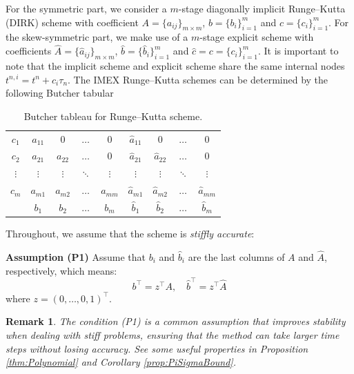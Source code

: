 \documentclass[a4paper, oneside]{book}
\def\hata{{\hat{a}}}
\def\hatA{{\hat{A}}}
\def\hatb{{\hat{b}}}
\newtheorem{remark}{Remark}[section]
\begin{document}


For the symmetric part, we consider a $m$-stage diagonally implicit Runge--Kutta (DIRK) scheme
with coefficient $A = \{a_{ij}\}_{m\times m}$, $b = \{b_{i}\}_{i=1}^m$ and $c = \{c_{i}\}_{i=1}^m$.
For the skew-symmetric part, we make use of a $m$-stage explicit scheme
with coefficients $\hatA = \{\hata_{ij}\}_{m\times m}$, $\hatb = \{\hatb_{i}\}_{i=1}^m$ and $\hat{c}=c = \{c_i\}_{i=1}^m$.
It is important to note that the implicit scheme and explicit scheme share the same internal nodes $t^{n,i} = t^{n}+c_i\tau_n$.
The IMEX Runge--Kutta schemes can be determined by the following Butcher tabular
\begin{table} 
    \centering
    \begin{tabular}[h]{c|cccc|cccc}
        $c_1$ & $a_{11}$ & $0$ & $\dots$ & $0$ & $\hata_{11}$ & $0$ & $\dots$ & $0$ \\
        $c_2$ & $a_{21}$ & $a_{22}$  & $\dots$ & $0$ & $\hata_{21}$ & $\hata_{22}$ & $\dots$ & $0$ \\
        $\vdots$ & $\vdots$ & $\vdots$  & $\ddots$ & $\vdots$ & $\vdots$ & $\vdots$ & $\ddots$ & $\vdots$ \\
        $c_m$ & $a_{m1}$ & $a_{m2}$  & $\dots$ & $a_{mm}$ & $\hata_{m1}$ & $\hata_{m2}$ & $\dots$ & $\hata_{mm}$ \\
        \hline
           & $b_1$ & $b_2$ & $\dots$ & $b_m$ & $\hatb_1$ & $\hatb_2$ & $\dots$ & $\hatb_m$
    \end{tabular}
    \caption{Butcher tableau for Runge--Kutta scheme.}
    \label{tab:Butcher}
\end{table}


Throughout, we assume that the scheme is \emph{stiffly accurate}:\vskip5pt

\noindent \textbf{Assumption (P1)} Assume that $b_i$ and $\hat{b}_i$ are the last columns of $A$ and $\hat{A}$, respectively, which means:
    \begin{equation}\label{eq:LastRow}
    b^\top = z^\top A, \quad \hat{b}^\top = z^\top \hat{A}
    \end{equation}
    where $z = (0, \dots, 0, 1)^\top$.

\begin{remark}
The condition (P1) is a common assumption that improves stability when dealing with stiff problems, ensuring that the method can take larger time steps without losing accuracy. See some useful properties in Proposition \ref{thm:Polynomial} and Corollary \ref{prop:PiSigmaBound}.
\end{remark}
\end{document}
